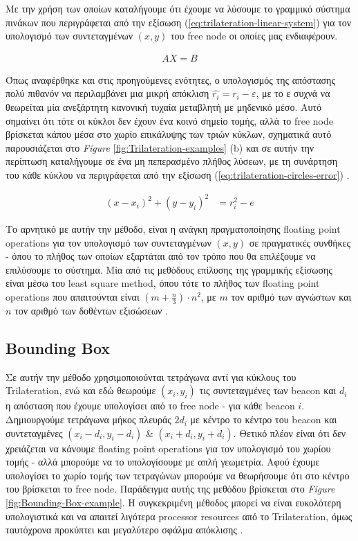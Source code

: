 Με την χρήση των οποίων καταλήγουμε ότι έχουμε να λύσουμε το γραμμικό σύστημα πινάκων που περιγράφεται από την εξίσωση (\ref{eq:trilateration-linear-system}) για τον
υπολογισμό των συντεταγμένων $(x,y)$ του free node οι οποίες μας ενδιαφέρουν.

\begin{align}
	AX = B \label{eq:trilateration-linear-system}
\end{align}

Όπως αναφέρθηκε και στις προηγούμενες ενότητες, ο υπολογισμός της απόστασης πολύ πιθανόν να περιλαμβάνει μια μικρή απόκλιση $\widehat{r_i} = r_i - ε$, 
με το ε συχνά να θεωρείται μία ανεξάρτητη κανονική τυχαία μεταβλητή με μηδενικό μέσο. Αυτό σημαίνει ότι
τότε οι κύκλοι δεν έχουν ένα κοινό σημείο τομής, αλλά το free node βρίσκεται κάπου μέσα στο χωρίο επικάλυψης
των τριών κύκλων, σχηματικά αυτό παρουσιάζεται στο \emph{Figure} \ref{fig:Trilateration-examples} (b) και σε αυτήν την περίπτωση καταλήγουμε σε ένα
μη πεπερασμένο πλήθος λύσεων, με τη συνάρτηση του κάθε κύκλου να περιγράφεται από την εξίσωση
(\ref{eq:trilateration-circles-error}) \cite{wsn-Localization-systems}.

\begin{align}
	(x-x_i)^2 + (y-y_i)^2 &= r_i^2-e \label{eq:trilateration-circles-error}
\end{align}

Το αρνητικό με αυτήν την μέθοδο, είναι η ανάγκη πραγματοποίησης floating point operations για τον υπολογισμό των συντεταγμένων $(x,y)$ σε πραγματικές συνθήκες - όπου το πλήθος
των οποίων εξαρτάται από τον τρόπο που θα επιλέξουμε να επιλύσουμε το σύστημα. 
Μία από τις μεθόδους επίλυσης της γραμμικής εξίσωσης είναι μέσω του least square method, όπου τότε το πλήθος των floating point operations
που απαιτούνται είναι $(m+\frac{n}{3})\cdot n^2$, με $m$ τον αριθμό των αγνώστων και $n$ τον αριθμό των δοθέντων εξισώσεων \cite{wsn-Localization-systems}.

\subsection{Bounding Box}
Σε αυτήν την μέθοδο χρησιμοποιούνται τετράγωνα αντί για κύκλους του Tri\-la\-te\-ra\-tion, ενώ και εδώ θεωρούμε $(x_i,y_i)$
τις συντεταγμένες των beacon και $d_i$ η από\-στα\-ση που έχουμε υπολογίσει από το free node - για κάθε beacon $i$. Δημιουργούμε
τετράγωνα μήκος πλευράς $2d_i$ με κέντρο το κέντρο του beacon και συντεταγμένες $(x_i - d_i, y_i - d_i)$ \& $(x_i + d_i, y_i + d_i)$. 
Θετικό πλέον είναι ότι δεν χρειάζεται να κάνουμε floating point operations για τον υπολογισμό του χωρίου τομής - αλλά μπορούμε να το υπολογίσουμε
με απλή γεωμετρία. Αφού έχουμε υπολογίσει το χωρίο τομής των τετραγώνων μπορούμε να θεωρήσουμε ότι στο κέντρο του βρίσκεται το free node.
Παράδειγμα αυτής της μεθόδου βρίσκεται στο \emph{Figure} \ref{fig:Bounding-Box-example}.
Η συγκεκριμένη μέθοδος μπορεί να είναι ευκολότερη υπολογιστικά και να απαιτεί λιγότερα processor resources από το Trilateration, όμως ταυτόχρονα 
προκύπτει και μεγαλύτερο σφάλμα απόκλισης \cite{wsn-Localization-systems}.   

